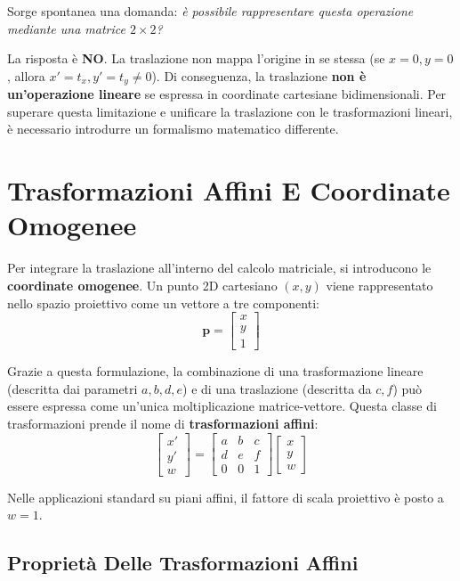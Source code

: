 ﻿\documentclass[11pt, a4paper]{article}
\begin{document}
Sorge spontanea una domanda: \emph{è possibile rappresentare questa operazione mediante una matrice $2 \times 2$?}

La risposta è \textbf{NO}. La traslazione non mappa l'origine in se stessa (se $x=0, y=0$, allora $x'=t_x, y'=t_y \neq 0$). Di conseguenza, la traslazione \textbf{non è un'operazione lineare} se espressa in coordinate cartesiane bidimensionali. Per superare questa limitazione e unificare la traslazione con le trasformazioni lineari, è necessario introdurre un formalismo matematico differente.

\newpage

\section{Trasformazioni Affini E Coordinate Omogenee}

Per integrare la traslazione all'interno del calcolo matriciale, si introducono le \textbf{coordinate omogenee}. Un punto 2D cartesiano $(x, y)$ viene rappresentato nello spazio proiettivo come un vettore a tre componenti:
\[
\bm{p} = \begin{bmatrix} x \\ y \\ 1 \end{bmatrix}
\]

Grazie a questa formulazione, la combinazione di una trasformazione lineare (descritta dai parametri $a, b, d, e$) e di una traslazione (descritta da $c, f$) può essere espressa come un'unica moltiplicazione matrice-vettore. Questa classe di trasformazioni prende il nome di \textbf{trasformazioni affini}:
\[
\begin{bmatrix} x' \\ y' \\ w \end{bmatrix} = \begin{bmatrix} a & b & c \\ d & e & f \\ 0 & 0 & 1 \end{bmatrix} \begin{bmatrix} x \\ y \\ w \end{bmatrix}
\]

Nelle applicazioni standard su piani affini, il fattore di scala proiettivo è posto a $w = 1$.

\subsection{Proprietà Delle Trasformazioni Affini}
\end{document}

